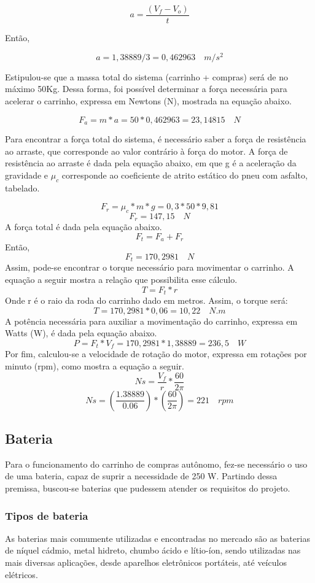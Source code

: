 $$ a=  \frac{(V_f-V_o)}{t}   $$ 

\par Então,

$$ a =  1,38889/3 = 0,462963 \quad m/s^2 $$ 

\par Estipulou-se que a massa total do sistema (carrinho + compras) será de no máximo 50Kg. Dessa forma, foi possível determinar a força necessária para acelerar o carrinho, expressa em Newtons (N), mostrada na equação abaixo.

$$ F_a = m*a = 50*0,462963 = 23,14815 \quad N $$

\par Para encontrar a força total do sistema, é necessário saber a força de resistência ao arraste, que corresponde ao valor contrário à força do motor. A força de resistência ao arraste é dada pela equação abaixo, em que g é a aceleração da gravidade e $\mu_c$ corresponde ao coeficiente de atrito estático do pneu com asfalto, tabelado.

$$ F_r = \mu_c*m*g = 0,3*50*9,81   $$
$$ F_r = 147,15 \quad N $$
		A força total é dada pela equação abaixo.
$$ F_t = F_a + F_r $$
Então,$$ F_t = 170,2981 \quad N   $$
		Assim, pode-se encontrar o torque necessário para movimentar o carrinho. A equação a seguir mostra a relação que possibilita esse cálculo.
$$ T = F_t*r $$
Onde r é o raio da roda do carrinho dado em metros. Assim, o torque será:
$$ T = 170,2981*0,06 = 10,22 \quad N.m $$
		A potência necessária para auxiliar a movimentação do carrinho, expressa em Watts (W), é dada pela equação abaixo.
$$ P = F_t*V_f = 170,2981*1,38889 = 236,5 \quad W $$
		Por fim, calculou-se a velocidade de rotação do motor, expressa em rotações por minuto (rpm), como mostra a equação a seguir.
$$ Ns = \frac{V_f}{r}*\frac{60}{2\pi} $$
$$ Ns = (\frac{1.38889}{0.06})*(\frac{60}{2\pi}) = 221 \quad rpm $$


\subsection {Bateria}
\par Para o funcionamento do carrinho de compras autônomo, fez-se necessário o uso de uma bateria, capaz de suprir a necessidade de 250 W. Partindo dessa premissa, buscou-se baterias que pudessem atender os requisitos do projeto.


\subsubsection {Tipos de bateria}
\par As baterias mais comumente utilizadas e encontradas no mercado são as baterias de níquel cádmio, metal hidreto, chumbo ácido e lítio-íon, sendo utilizadas nas mais diversas aplicações, desde aparelhos eletrônicos portáteis, até veículos elétricos.\cite{Costa}

